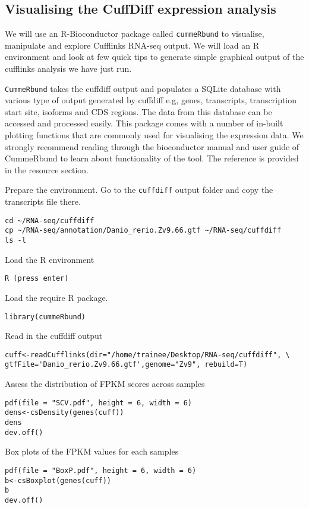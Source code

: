 \begin{bonus}
\section{Visualising the CuffDiff expression analysis}
We will use an R-Bioconductor package called \texttt{cummeRbund} to visualise, manipulate and explore Cufflinks RNA-seq output. We will load an R environment and look at few quick tips to generate simple graphical output of the cufflinks analysis we have just run.

\begin{information}
\texttt{CummeRbund} takes the cuffdiff output and populates a SQLite database with various type of output generated by cuffdiff e.g, genes, transcripts, transcription start site, isoforms and CDS regions. The data from this database can be accessed and processed easily. This package comes with a number of in-built plotting functions that are commonly used for visualising the expression data. We strongly recommend reading through the bioconductor manual and user guide of CummeRbund to learn about functionality of the tool. The reference is provided in the resource section.
\end{information}

\begin{steps}
Prepare the environment. Go to the \texttt{cuffdiff} output folder and copy the transcripts file there.
\begin{lstlisting}
cd ~/RNA-seq/cuffdiff
cp ~/RNA-seq/annotation/Danio_rerio.Zv9.66.gtf ~/RNA-seq/cuffdiff
ls -l
\end{lstlisting}

Load the R environment
\begin{lstlisting}
R (press enter)
\end{lstlisting}
Load the require R package.
\begin{lstlisting}
library(cummeRbund)
\end{lstlisting}
Read in the cuffdiff output
\begin{lstlisting}
cuff<-readCufflinks(dir="/home/trainee/Desktop/RNA-seq/cuffdiff", \
gtfFile='Danio_rerio.Zv9.66.gtf',genome="Zv9", rebuild=T)
\end{lstlisting}
Assess the distribution of FPKM scores across samples
\begin{lstlisting}
pdf(file = "SCV.pdf", height = 6, width = 6)
dens<-csDensity(genes(cuff))
dens
dev.off()
\end{lstlisting}
Box plots of the FPKM values for each samples
\begin{lstlisting}
pdf(file = "BoxP.pdf", height = 6, width = 6)
b<-csBoxplot(genes(cuff))
b
dev.off()
\end{lstlisting}




\end{steps}
\end{bonus}
